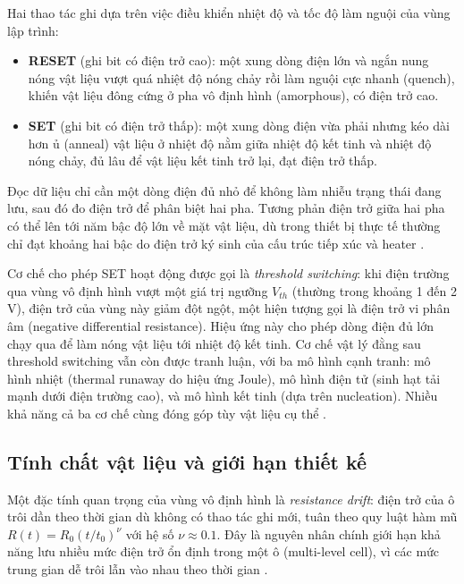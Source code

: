 \documentclass[12pt,a4paper]{article}
\begin{document}
Hai thao tác ghi dựa trên việc điều khiển nhiệt độ và tốc độ làm nguội của vùng lập trình:

\begin{itemize}[leftmargin=1.5em]
    \item \textbf{RESET} (ghi bit có điện trở cao): một xung dòng điện lớn và ngắn nung nóng vật liệu vượt quá nhiệt độ nóng chảy rồi làm nguội cực nhanh (quench), khiến vật liệu đông cứng ở pha vô định hình (amorphous), có điện trở cao.
    \item \textbf{SET} (ghi bit có điện trở thấp): một xung dòng điện vừa phải nhưng kéo dài hơn ủ (anneal) vật liệu ở nhiệt độ nằm giữa nhiệt độ kết tinh và nhiệt độ nóng chảy, đủ lâu để vật liệu kết tinh trở lại, đạt điện trở thấp.
\end{itemize}

Đọc dữ liệu chỉ cần một dòng điện đủ nhỏ để không làm nhiễu trạng thái đang lưu, sau đó đo điện trở để phân biệt hai pha. Tương phản điện trở giữa hai pha có thể lên tới năm bậc độ lớn về mặt vật liệu, dù trong thiết bị thực tế thường chỉ đạt khoảng hai bậc do điện trở ký sinh của cấu trúc tiếp xúc và heater \cite{wong2010}.

Cơ chế cho phép SET hoạt động được gọi là \textit{threshold switching}: khi điện trường qua vùng vô định hình vượt một giá trị ngưỡng $V_{th}$ (thường trong khoảng 1 đến 2 V), điện trở của vùng này giảm đột ngột, một hiện tượng gọi là điện trở vi phân âm (negative differential resistance). Hiệu ứng này cho phép dòng điện đủ lớn chạy qua để làm nóng vật liệu tới nhiệt độ kết tinh. Cơ chế vật lý đằng sau threshold switching vẫn còn được tranh luận, với ba mô hình cạnh tranh: mô hình nhiệt (thermal runaway do hiệu ứng Joule), mô hình điện tử (sinh hạt tải mạnh dưới điện trường cao), và mô hình kết tinh (dựa trên nucleation). Nhiều khả năng cả ba cơ chế cùng đóng góp tùy vật liệu cụ thể \cite{wong2010}.

\subsection{Tính chất vật liệu và giới hạn thiết kế}

Một đặc tính quan trọng của vùng vô định hình là \textit{resistance drift}: điện trở của ô trôi dần theo thời gian dù không có thao tác ghi mới, tuân theo quy luật hàm mũ $R(t) = R_0 (t/t_0)^{\nu}$ với hệ số $\nu \approx 0.1$. Đây là nguyên nhân chính giới hạn khả năng lưu nhiều mức điện trở ổn định trong một ô (multi-level cell), vì các mức trung gian dễ trôi lẫn vào nhau theo thời gian \cite{wong2010}.
\end{document}
